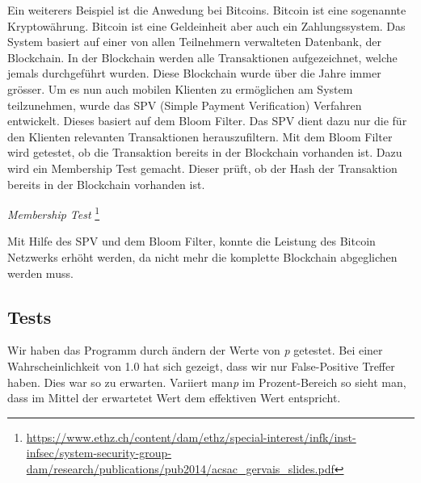 \documentclass[a4paper, 12pt]{article}
\begin{document}
Ein weiterers Beispiel ist die Anwedung bei Bitcoins. Bitcoin ist eine sogenannte Kryptow\"ahrung. Bitcoin ist eine Geldeinheit aber auch ein Zahlungssystem. Das System basiert auf einer von allen Teilnehmern verwalteten Datenbank, der Blockchain. In der Blockchain werden alle Transaktionen aufgezeichnet, welche jemals durchgef\"uhrt wurden. Diese Blockchain wurde \"uber die Jahre immer gr\"osser. Um es nun auch mobilen Klienten zu erm\"oglichen am System teilzunehmen, wurde das SPV (Simple Payment Verification) Verfahren entwickelt. Dieses basiert auf dem Bloom Filter. Das SPV dient dazu nur die f\"ur den Klienten relevanten Transaktionen herauszufiltern. Mit dem Bloom Filter wird getestet, ob die Transaktion bereits in der Blockchain vorhanden ist. Dazu wird ein Membership Test gemacht. Dieser pr\"uft, ob der Hash der Transaktion bereits in der Blockchain vorhanden ist.
\medskip
\par
\begin{center}
{%
\setlength{\fboxsep}{1pt}%
\setlength{\fboxrule}{1pt}%
%
}%
\newline \textit{Membership Test}
\footnote{\url{https://www.ethz.ch/content/dam/ethz/special-interest/infk/inst-infsec/system-security-group-dam/research/publications/pub2014/acsac_gervais_slides.pdf}}
\end{center}
\medskip
\par
Mit Hilfe des SPV und dem Bloom Filter, konnte die Leistung des Bitcoin Netzwerks erh\"oht werden, da nicht mehr die komplette Blockchain abgeglichen werden muss.


\subsection{Tests}
Wir haben das Programm durch \"andern der Werte von \textit{p} getestet. Bei einer Wahrscheinlichkeit von 1.0 hat sich gezeigt, dass wir nur False-Positive Treffer haben. Dies war so zu erwarten. Variiert man\textit{p} im Prozent-Bereich so sieht man, dass im Mittel der erwartetet Wert dem effektiven Wert entspricht.
\end{document}
